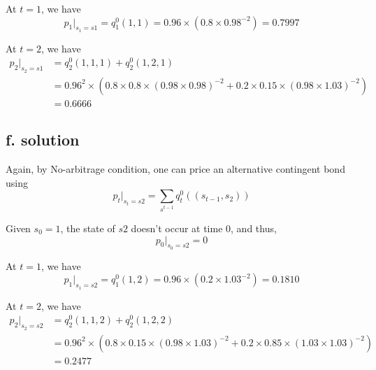 \documentclass[11pt]{article}
\theoremstyle{definition}
\theoremstyle{boldtitle} %
\numberwithin{equation}{section}
\numberwithin{figure}{section}
\numberwithin{table}{section}
\begin{document}
At $t=1$, we have 
\[
p_1|_{s_1 = s1} = q^0_1(1, 1) = 0.96 \times (0.8 \times 0.98^{-2}) = 0.7997
\]


At $t=2$, we have 
\begin{align*}
p_2|_{s_2 = s1} & = q^0_2(1, 1, 1) + q^0_2(1, 2, 1) \\
  & = 0.96^2 \times (0.8 \times 0.8 \times (0.98 \times 0.98)^{-2} + 
      0.2 \times 0.15 \times (0.98 \times 1.03)^{-2}) \\
  & = 0.6666
\end{align*}


\subsection{f. solution}
Again, by No-arbitrage condition, one can price an alternative contingent bond using
\[
p_t|_{s_t = s2} = \sum_{s^{t-1}} q^0_t((s_{t-1}, s_2))
\]

Given $s_0 = 1$, the state of $s2$ doesn't occur at time 0, and thus,
\[
p_0|_{s_0 = s2} = 0
\]

At $t=1$, we have 
\[
p_1|_{s_1 = s2} = q^0_1(1, 2) = 0.96 \times (0.2 \times 1.03^{-2}) = 0.1810
\]


At $t=2$, we have 
\begin{align*}
p_2|_{s_2 = s2} & = q^0_2(1, 1, 2) + q^0_2(1, 2, 2) \\
  & = 0.96^2 \times (0.8 \times 0.15 \times (0.98 \times 1.03)^{-2} + 
      0.2 \times 0.85 \times (1.03 \times 1.03)^{-2}) \\
  & = 0.2477
\end{align*}
\end{document}
